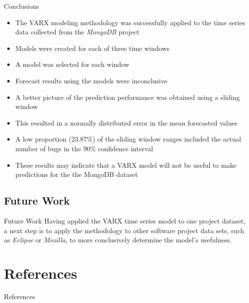 \documentclass[presentation]{beamer}
\begin{document}
\begin{frame}[t]{Conclusions}
\footnotesize{
\begin{itemize}
\item{The VARX modeling methodology was successfully applied to the time series data collected from the \textit{MongoDB} project}
\item{Models were created for each of three time windows}
\item{A model was selected for each window}
\item{Forecast results using the models were inconclusive}
\item{A better picture of the prediction performance was obtained using a sliding window}
\item{This resulted in a normally distributed error in the mean forecasted values}
\item{A low proportion (23.87\%) of the sliding window ranges included the actual number of bugs in the 90\% confidence interval}
\item{These results may indicate that a VARX model will not be useful to make predictions for the the MongoDB dataset}
\end{itemize}
}
\end{frame}

\subsection{Future Work}

\begin{frame}{Future Work}
Having applied the VARX time series model to one project dataset, a next step is to apply the methodology to other software project data sets, such as \textit{Eclipse} or \textit{Mozilla}, to more conclusively determine the model's usefulness.
\end{frame}

\section{References}

\begin{frame}[allowframebreaks]{References}
\begin{center}


\end{center}
\end{frame}
\end{document}
